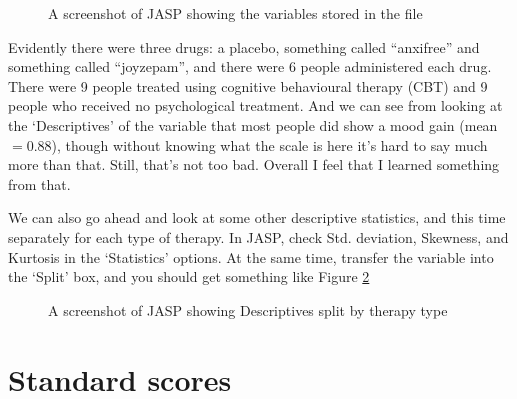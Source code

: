 \vspace{0.5cm}
\begin{figure}[ht]
\begin{center}
\caption{A screenshot of JASP showing the variables stored in the  file}
\label{fig:clinicaltrial}
\HR
\end{center}
\end{figure}

Evidently there were three drugs: a placebo, something called ``anxifree'' and something called ``joyzepam'', and there were 6 people administered each drug. There were 9 people treated using cognitive behavioural therapy (CBT) and 9 people who received no psychological treatment. And we can see from looking at the `Descriptives' of the  variable that most people did show a mood gain (mean $=0.88$), though without knowing what the scale is here it's hard to say much more than that. Still, that's not too bad. Overall I feel that I learned something from that.

We can also go ahead and look at some other descriptive statistics, and this time separately for each type of therapy. In JASP, check Std. deviation, Skewness, and Kurtosis in the `Statistics' options. At the same time, transfer the  variable into the `Split' box, and you should get something like Figure \ref{fig:clinicaltrial_grouping}

\vspace{0.5cm}
\begin{figure}[htb]
\begin{center}
\caption{A screenshot of JASP showing Descriptives split by therapy type}
\label{fig:clinicaltrial_grouping}
\HR
\end{center}
\end{figure}


\section{Standard scores~\label{sec:zscore}}

